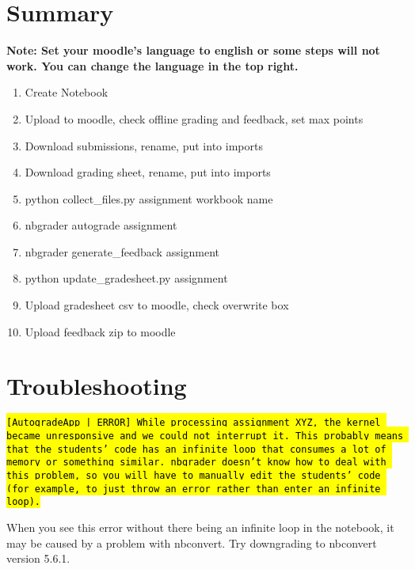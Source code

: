 \documentclass{article}
\newcommand{\consolecommand}[1]{
\begingroup%
  \sethlcolor{cmd}%
  \hl{\texttt{#1}}%
\endgroup}
\begin{document}
	\section{Summary}
	\textbf{Note: Set your moodle's language to english or some steps will not work. You can change the language in the top right.}
	\begin{enumerate}
		\item Create Notebook
		\item Upload to moodle, check offline grading and feedback, set max points
		\item Download submissions, rename, put into imports
		\item Download grading sheet, rename, put into imports
		\item python collect\_files.py \textlangle{}assignment\textrangle{} \textlangle{}workbook name\textrangle{}
		\item nbgrader autograde \textlangle{}assignment\textrangle{}
		\item nbgrader generate\_feedback \textlangle{}assignment\textrangle{}
		\item python update\_gradesheet.py \textlangle{}assignment\textrangle{}
		\item Upload gradesheet csv to moodle, check overwrite box
		\item Upload feedback zip to moodle
	\end{enumerate}

	\section{Troubleshooting}

	\consolecommand{[AutogradeApp | ERROR] While processing assignment XYZ, the kernel became unresponsive and we could not interrupt it. This probably means that the students' code has an infinite loop that consumes a lot of memory or something similar. nbgrader doesn't know how to deal with this problem, so you will have to manually edit the students' code (for example, to just throw an error rather than enter an infinite loop).}

When you see this error without there being an infinite loop in the notebook, it may be caused by a problem with nbconvert. Try downgrading to nbconvert version 5.6.1.
	
\end{document}
